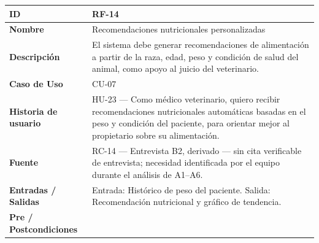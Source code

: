 \documentclass[
]{article}
\newcounter{none} %
\begin{document}
{\def\LTcaptype{none} %
\begin{longtable}[]{|
  >{\raggedright\arraybackslash}p{}|
  >{\raggedright\arraybackslash}p{}|}
\hline
\begin{minipage}[b]{\linewidth}\raggedright
\textbf{ID}
\end{minipage} & \begin{minipage}[b]{\linewidth}\raggedright
RF-14
\end{minipage} \\
\hline
\endhead
\hline
\endlastfoot
\textbf{Nombre} & \begin{minipage}[t]{\linewidth}\raggedright
Recomendaciones nutricionales personalizadas
\end{minipage} \\
\hline
\textbf{Descripción} & \begin{minipage}[t]{\linewidth}\raggedright
El sistema debe generar recomendaciones de alimentación a partir de la raza, edad, peso y condición de salud del animal, como apoyo al juicio del veterinario.
\end{minipage} \\
\hline
\textbf{Caso de Uso} & \begin{minipage}[t]{\linewidth}\raggedright
CU-07
\end{minipage} \\
\hline
\textbf{Historia de usuario} & \begin{minipage}[t]{\linewidth}\raggedright
HU-23 — Como médico veterinario, quiero recibir recomendaciones nutricionales automáticas basadas en el peso y condición del paciente, para orientar mejor al propietario sobre su alimentación.
\end{minipage} \\
\hline
\textbf{Fuente} & \begin{minipage}[t]{\linewidth}\raggedright
RC-14 — Entrevista B2, derivado — sin cita verificable de entrevista; necesidad identificada por el equipo durante el análisis de A1–A6.
\end{minipage} \\
\hline
\textbf{Entradas / Salidas} & \begin{minipage}[t]{\linewidth}\raggedright
Entrada: Histórico de peso del paciente. Salida: Recomendación nutricional y gráfico de tendencia.
\end{minipage} \\
\hline
\textbf{Pre / Postcondiciones} & \begin{minipage}[t]{\linewidth}\raggedright

\end{minipage}
\end{longtable}}
\end{document}
